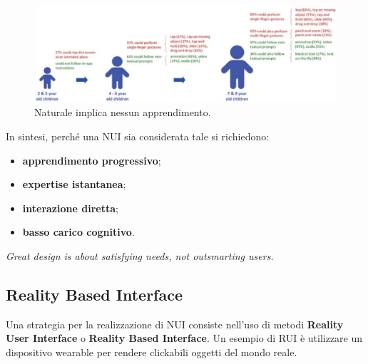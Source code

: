 \begin{figure}[!h]
	\centering
	\includegraphics[scale=0.25]{immagini/nui-bambini.png}
	\caption{Naturale implica nessun apprendimento.}
\end{figure}

In sintesi, perch\'e una NUI sia considerata tale si richiedono:
\begin{itemize}
	\itemsep-0.3em
	\item \textbf{apprendimento progressivo};
	\item \textbf{expertise istantanea};
	\item \textbf{interazione diretta};
	\item \textbf{basso carico cognitivo}.
\end{itemize}

\begin{flushleft}
	\textit{Great design is about satisfying needs, not outsmarting users.}
\end{flushleft}

\subsection*{Reality Based Interface}
Una strategia per la realizzazione di NUI consiste nell'uso di metodi \textbf{Reality User Interface} o \textbf{Reality Based Interface}.
Un esempio di RUI è utilizzare un dispositivo wearable per rendere clickabili oggetti del mondo reale.

